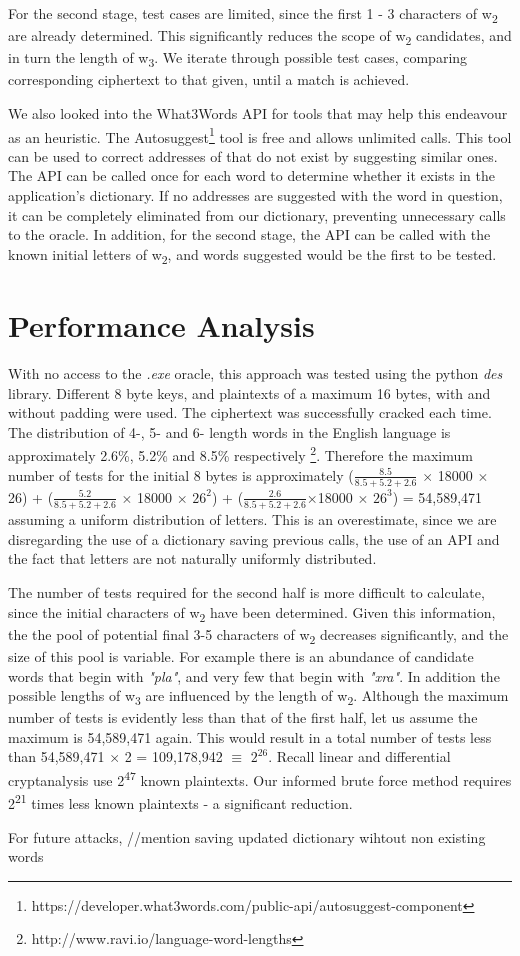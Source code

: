 \documentclass{article}[]
\begin{document}
	For the second stage, test cases are limited, since the first 1 - 3 characters of w\textsubscript{2} are already determined. This significantly reduces the scope of w\textsubscript{2} candidates, and in turn the length of w\textsubscript{3}. We iterate through possible test cases, comparing corresponding ciphertext to that given, until a match is achieved.
	
	We also looked into the What3Words API for tools that may help this endeavour as an heuristic. The Autosuggest\footnote{https://developer.what3words.com/public-api/autosuggest-component} tool is free and allows unlimited calls. This tool can be used to correct addresses of that do not exist by suggesting similar ones. The API can be called once for each word to determine whether it exists in the application's dictionary. If no addresses are suggested with the word in question, it can be completely eliminated from our dictionary, preventing unnecessary calls to the oracle. In addition, for the second stage, the API can be called with the known initial letters of w\textsubscript{2}, and words suggested would be the first to be tested. 
	
	
	\section{Performance Analysis}
	With no access to the \textit{.exe} oracle, this approach was tested using the python \textit{des} library. Different 8 byte keys, and  plaintexts of a maximum 16 bytes, with and without padding were used. The ciphertext was successfully cracked each time. The distribution of 4-, 5- and 6- length words in the English language is approximately 2.6\%, 5.2\% and 8.5\% respectively \footnote{http://www.ravi.io/language-word-lengths}. Therefore the maximum number of tests for the initial 8 bytes is approximately  ($\frac{8.5}{8.5+5.2+2.6}$ $\times$ 18000 $\times$ 26) + ($\frac{5.2}{8.5+5.2+2.6}$ $\times$ 18000 $\times$ $26^2$) + ($\frac{2.6}{8.5+5.2+2.6}$$\times$18000 $\times$ $26^3$) = 54,589,471 assuming a uniform distribution of letters. This is an overestimate, since we are disregarding the use of a dictionary saving previous calls, the use of an API and the fact that letters are not naturally uniformly distributed. 
	
	The number of tests required for the second half is more difficult to calculate, since the initial characters of w\textsubscript{2} have been determined. Given this information, the the pool of potential final 3-5 characters of w\textsubscript{2} decreases significantly, and the size of this pool is variable. For example there is an abundance of candidate words that begin with \textit{"pla"}, and very few that begin with \textit{"xra"}.  In addition the possible lengths of w\textsubscript{3} are influenced by the length of w\textsubscript{2}. Although the maximum number of tests is evidently less than that of the first half, let us assume the maximum is 54,589,471 again. This would result in a total number of tests less than 54,589,471 $\times$ 2 = 109,178,942 $\equiv$ $2^{26}$. Recall linear and differential cryptanalysis use 2\textsuperscript{47} known plaintexts. Our informed brute force method requires 2\textsuperscript{21} times less known plaintexts - a significant reduction.
	
	For future attacks, //mention saving updated dictionary wihtout non existing words
	
\end{document}
